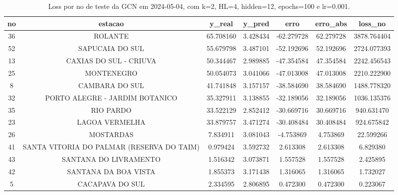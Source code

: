 \begin{table}[h]
\centering
\caption{Loss por no de teste da GCN em 2024-05-04, com k=2, HL=4, hidden=12, epochs=100 e lr=0.001.}
\label{tab:gcn_loss_k2_hl4_h12_e100_d20240504}
\begin{tabular}{ccccccc}
\toprule
no & estacao & y\_real & y\_pred & erro & erro\_abs & loss\_no \\
\midrule
36 & ROLANTE & 65.708160 & 3.428434 & -62.279728 & 62.279728 & 3878.764404 \\
52 & SAPUCAIA DO SUL & 55.679798 & 3.487101 & -52.192696 & 52.192696 & 2724.077393 \\
13 & CAXIAS DO SUL - CRIUVA & 50.344467 & 2.989885 & -47.354584 & 47.354584 & 2242.456543 \\
25 & MONTENEGRO & 50.054073 & 3.041066 & -47.013008 & 47.013008 & 2210.222900 \\
8 & CAMBARA DO SUL & 41.741848 & 3.157157 & -38.584690 & 38.584690 & 1488.778320 \\
32 & PORTO ALEGRE - JARDIM BOTANICO & 35.327911 & 3.138855 & -32.189056 & 32.189056 & 1036.135376 \\
35 & RIO PARDO & 33.522129 & 2.852412 & -30.669716 & 30.669716 & 940.631470 \\
23 & LAGOA VERMELHA & 33.879757 & 3.471274 & -30.408484 & 30.408484 & 924.675842 \\
26 & MOSTARDAS & 7.834911 & 3.081043 & -4.753869 & 4.753869 & 22.599266 \\
41 & SANTA VITORIA DO PALMAR (RESERVA DO TAIM) & 0.979424 & 3.592732 & 2.613308 & 2.613308 & 6.829380 \\
43 & SANTANA DO LIVRAMENTO & 1.516342 & 3.073871 & 1.557528 & 1.557528 & 2.425895 \\
42 & SANTANA DA BOA VISTA & 1.855373 & 3.171438 & 1.316065 & 1.316065 & 1.732027 \\
5 & CACAPAVA DO SUL & 2.334595 & 2.806895 & 0.472300 & 0.472300 & 0.223067 \\
\bottomrule
\end{tabular}
\end{table}

